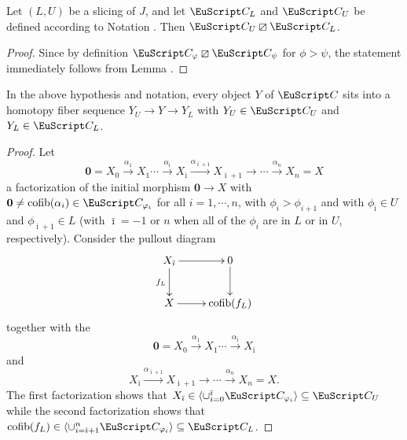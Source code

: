 \begin{lemma}\label{uno}
Let $(L,U)$ be a slicing of $J$, and let $\C_L$ and $\C_U$ be defined according to Notation .  Then $\C_U\orth \C_L$.\end{lemma}
\begin{proof}
Since by definition $\C_\phi\orth\C_\psi$ for $\phi>\psi$, the statement immediately follows from Lemma .
\end{proof}

\begin{lemma}\label{due}
In the above hypothesis and notation, every object $Y$ of $\C$ sits into a homotopy fiber sequence $Y_{U}\to Y\to Y_{L}$ with $Y_{U}\in \C_{U}$ and $Y_{L}\in \C_{L}$.
\end{lemma}
\begin{proof}
Let
\[
\mathbf{0}=X_0 \xrightarrow{\alpha_1} X_1\cdots \xrightarrow{\alpha_{{\bar\imath}}}X_{{\bar\imath}}\xrightarrow{\alpha_{{\bar\imath}+1}}X_{{\bar\imath}+1}\xrightarrow{}\cdots \xrightarrow{\alpha_n} X_n=X
\]
a factorization of the initial morphism $\mathbf{0} \to X$
with $\mathbf{0} \neq \cofib(\alpha_i) \in \C_{\phi_i}$ for all $i = 1, \cdots, n$, with $\phi_i>\phi_{i+1}$ and with $\phi_{{\bar\imath}}\in U$ and $\phi_{{\bar\imath}+1}\in L$ (with ${\bar\imath}=-1$ or $n$ when all of the $\phi_i$ are in $L$ or in $U$, respectively). 
Consider the pullout diagram
\[
\xymatrix{
X_{{\bar\imath}}\ar[r]\ar[d]_{f_{L}}&0\ar[d]\\
X\ar[r]&\mathrm{cofib}(f_{L})
}\]
together with the %
\[
\mathbf{0}=X_0 \xrightarrow{\alpha_1} X_1\cdots \xrightarrow{\alpha_{{\bar\imath}}}X_{{\bar\imath}} 
\]
and
\[
X_{{\bar\imath}}\xrightarrow{\alpha_{{\bar\imath}+1}}X_{{\bar\imath}+1}\xrightarrow{}\cdots \xrightarrow{\alpha_n} X_n=X.
\]
The first factorization shows that $X_{{\bar\imath}}\in \langle\cup_{i=0}^{{\bar\imath}}\C_{\phi_i}\rangle\subseteq \C_{U}$ while the second factorization shows that $\mathrm{cofib}(f_{L})\in  \langle\cup_{i={\bar\imath}+1}^n\C_{\phi_i}\rangle\subseteq \C_{L}$.
\end{proof}

